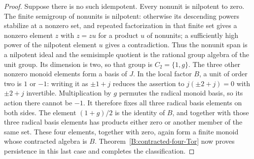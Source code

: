 \begin{proof}
Suppose there is no such idempotent.  Every nonunit is nilpotent
to zero.  The finite semigroup of nonunits is nilpotent: otherwise
its descending powers stabilize at a nonzero set, and repeated
factorization in that finite set gives a nonzero element $z$
with $z=zu$ for a product $u$ of nonunits; a sufficiently high
power of the nilpotent element $u$ gives a contradiction.
Thus the nonunit span is a nilpotent ideal and the semisimple
quotient is the rational group algebra of the unit group.
Its dimension is two, so that group is $C_2=\{1,g\}$.
The three other nonzero monoid elements form a basis of $J$.
In the local factor $B$, a unit of order two is $1$ or $-1$:
writing it as $\pm1+j$ reduces the assertion to
$j(\pm2+j)=0$ with $\pm2+j$ invertible.
Multiplication by $g$ permutes the radical monoid basis, so its
action there cannot be $-1$.  It therefore fixes all three
radical basis elements on both sides.
The element $(1+g)/2$ is the identity of $B$, and together with
those three radical basis elements has products either zero or
another member of the same set.  These four elements, together
with zero, again form a finite monoid whose contracted algebra
is $B$.
Theorem~\ref{B:contracted-four-Tor} now proves persistence in
this last case and completes the classification.
\end{proof}
